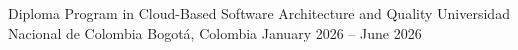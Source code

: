
\begin{cventries}

\cventry
{Diploma Program in Cloud-Based Software Architecture and Quality}
{Universidad Nacional de Colombia}
{Bogotá, Colombia}
{January 2026 -- June 2026}
{}

\end{cventries}